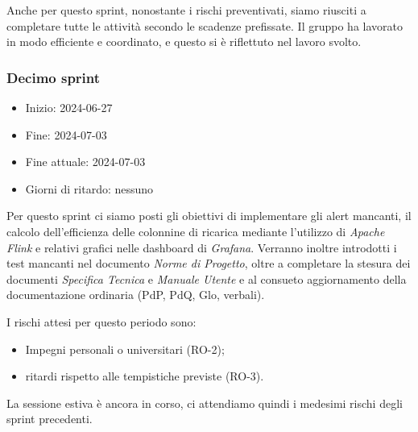 Anche per questo sprint, nonostante i rischi preventivati, siamo riusciti a completare tutte le attività secondo le scadenze prefissate. Il gruppo ha lavorato in modo efficiente e coordinato, e questo si è riflettuto nel lavoro svolto.



\newpage
\subsubsection{Decimo sprint}
\begin{itemize}
    \item Inizio: 2024-06-27
    \item Fine: 2024-07-03
    \item Fine attuale: 2024-07-03
    \item Giorni di ritardo: nessuno
\end{itemize}

Per questo sprint ci siamo posti gli obiettivi di implementare gli alert mancanti, il calcolo dell'efficienza delle colonnine di ricarica mediante l'utilizzo di \textit{Apache Flink} e relativi grafici nelle dashboard di \textit{Grafana}. Verranno inoltre introdotti i test mancanti nel documento \textit{Norme di Progetto}, oltre a completare la stesura dei documenti \textit{Specifica Tecnica} e \textit{Manuale Utente} e al consueto aggiornamento della documentazione ordinaria (PdP, PdQ, Glo, verbali).

I rischi attesi per questo periodo sono:
\begin{itemize}
    \item Impegni personali o universitari (RO-2);
	\item ritardi rispetto alle tempistiche previste (RO-3).
\end{itemize}
La sessione estiva è ancora in corso, ci attendiamo quindi i medesimi rischi degli sprint precedenti.

